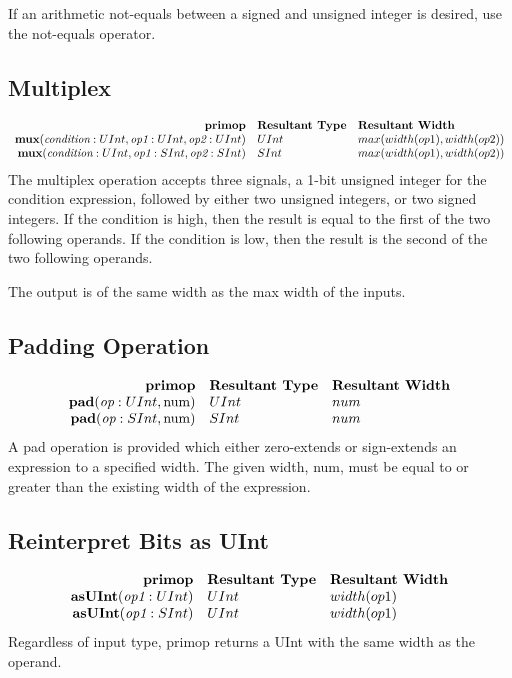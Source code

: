 \documentclass[12pt]{article}
\begin{document}
If an arithmetic not-equals between a signed and unsigned integer is desired, use the not-equals operator.

\subsection{Multiplex}
\[
\begin{array}{rll}
\text{\bf primop} & \text{\bf Resultant Type} & \text{\bf Resultant Width} \\
\text{\bf mux}  (\text{\em condition}:UInt, \text{\em op1}:UInt, \text{\em op2}:UInt) & UInt & max(width(op1),width(op2)) \\
\text{\bf mux}  (\text{\em condition}:UInt, \text{\em op1}:SInt, \text{\em op2}:SInt) & SInt & max(width(op1),width(op2)) \\
\end{array}
\]
The multiplex operation accepts three signals, a 1-bit unsigned integer for the condition expression, followed by either two unsigned integers, or two signed integers.
If the condition is high, then the result is equal to the first of the two following operands.
If the condition is low, then the result is the second of the two following operands. 

The output is of the same width as the max width of the inputs.

\subsection{Padding Operation}
\[
\begin{array}{rll}
\text{\bf primop} & \text{\bf Resultant Type} & \text{\bf Resultant Width} \\
\text{\bf pad}(\text{\em op}:UInt, \text{num})     & UInt & num \\
\text{\bf pad}(\text{\em op}:SInt, \text{num})     & SInt & num \\
\end{array}
\]
A pad operation is provided which either zero-extends or sign-extends an expression to a specified width.
The given width, num, must be equal to or greater than the existing width of the expression. 

\subsection{Reinterpret Bits as UInt}
\[
\begin{array}{rll}
\text{\bf primop} & \text{\bf Resultant Type} & \text{\bf Resultant Width} \\
\text{\bf asUInt}(\text{\em op1}:UInt)       & UInt & width(op1) \\
\text{\bf asUInt}(\text{\em op1}:SInt)       & UInt & width(op1) \\
\end{array}
\]
Regardless of input type, primop returns a UInt with the same width as the operand.
\end{document}
